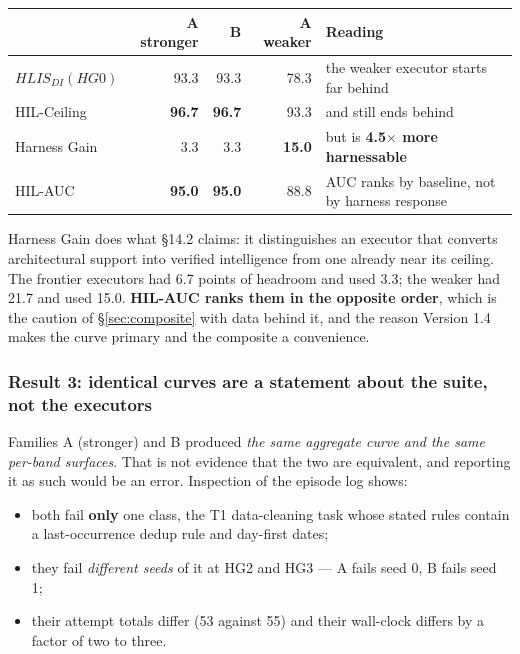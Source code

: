 \documentclass[11pt]{article}
\theoremstyle{definition}
\begin{document}
\begin{table}[h]
\centering\small
\begin{tabularx}{\textwidth}{@{}lrrrY@{}}
\toprule
& A stronger & B & A weaker & Reading \\
\midrule
$HLIS_{DI}(HG0)$ & 93.3 & 93.3 & 78.3 & the weaker executor starts far behind \\
HIL-Ceiling & \textbf{96.7} & \textbf{96.7} & 93.3 & and still ends behind \\
Harness Gain & 3.3 & 3.3 & \textbf{15.0} & but is \textbf{4.5$\times$ more harnessable} \\
HIL-AUC & \textbf{95.0} & \textbf{95.0} & 88.8 & AUC ranks by baseline, not by harness response \\
\bottomrule
\end{tabularx}
\end{table}

Harness Gain does what \S14.2 claims: it distinguishes an executor that converts architectural support into verified intelligence from one already near its ceiling. The frontier executors had 6.7 points of headroom and used 3.3; the weaker had 21.7 and used 15.0. \textbf{HIL-AUC ranks them in the opposite order}, which is the caution of \S\ref{sec:composite} with data behind it, and the reason Version 1.4 makes the curve primary and the composite a convenience.

\subsubsection{Result 3: identical curves are a statement about the suite, not the executors}

Families A (stronger) and B produced \emph{the same aggregate curve and the same per-band surfaces}. That is not evidence that the two are equivalent, and reporting it as such would be an error. Inspection of the episode log shows:

\begin{itemize}
\item both fail \textbf{only} one class, the T1 data-cleaning task whose stated rules contain a last-occurrence dedup rule and day-first dates;
\item they fail \emph{different seeds} of it at HG2 and HG3 --- A fails seed 0, B fails seed 1;
\item their attempt totals differ (53 against 55) and their wall-clock differs by a factor of two to three.
\end{itemize}
\end{document}
